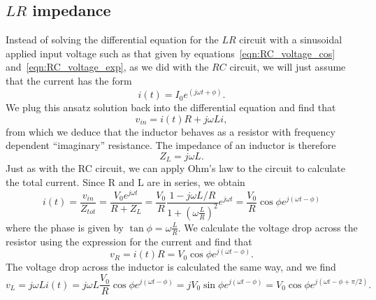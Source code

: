 \documentclass{article}
\begin{document}
\subsection{$LR$ impedance}
Instead of solving the differential equation for the $LR$ circuit with a sinusoidal applied input voltage such as that given by equations~\ref{eqn:RC_voltage_cos} and~\ref{eqn:RC_voltage_exp}, as we did with the $RC$ circuit, we will just assume that the current has the form
\begin{equation}
i(t) = I_0 e^{(j\omega t + \phi)}.
\end{equation}
We plug this ansatz solution back into the differential equation and find that
\begin{equation}
v_{in} = i(t) R + j \omega L i,
\end{equation}
from which we deduce that the inductor behaves as a resistor with frequency dependent ``imaginary'' resistance. The impedance of an inductor is therefore
\begin{equation}
Z_L = j \omega L.
\end{equation}
Just as with the RC circuit, we can apply Ohm's law to the circuit to calculate the total current. Since R and L are in series, we obtain
\begin{equation}
i(t) = \frac{v_{in}}{Z_{tot}} = \frac{V_0 e^{j\omega t}}{R + Z_L} = \frac{V_0}{R} \frac{1 - j\omega L/R}{1 + \left(\omega \frac{L}{R}\right)^2} e^{j\omega t} = \frac{V_0}{R} \cos\phi e^{j(\omega t - \phi)}
\end{equation}
where the phase is given by $\tan\phi = \omega\frac{L}{R}$. We calculate the voltage drop across the resistor using the expression for the current and find that
\begin{equation}
v_R = i(t) R = V_0 \cos\phi e^{j(\omega t - \phi)}.
\end{equation}
The voltage drop across the inductor is calculated the same way, and we find
\begin{equation}
v_L = j\omega L i(t) = j\omega L \frac{V_0}{R} \cos\phi e^{j(\omega t - \phi)} = j V_0 \sin\phi e^{j(\omega t - \phi)} = V_0 \cos\phi e^{j(\omega t - \phi + \pi/2)}.
\end{equation}
\end{document}
